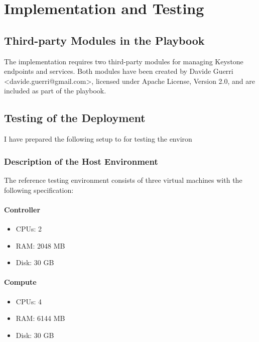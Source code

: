 \chapter{Implementation and Testing}
\label{ch:testing}


\section{Third-party Modules in the Playbook}

The implementation requires two third-party modules for managing Keystone endpoints and services. Both modules have been created by Davide Guerri <davide.guerri@gmail.com>, licensed under Apache License, Version 2.0, and are included as part of the playbook.

\section{Testing of the Deployment}

I have prepared the following setup to for testing the environ
\subsection{Description of the Host Environment}

The reference testing environment consists of three virtual machines with the following specification:

\subsubsection*{Controller}

\begin{itemize}
  \item{CPUs: 2}
  \item{RAM: 2048 MB}
  \item{Disk: 30 GB}
\end{itemize}

\subsubsection*{Compute}

\begin{itemize}
  \item{CPUs: 4}
  \item{RAM: 6144 MB}
  \item{Disk: 30 GB}
\end{itemize}

